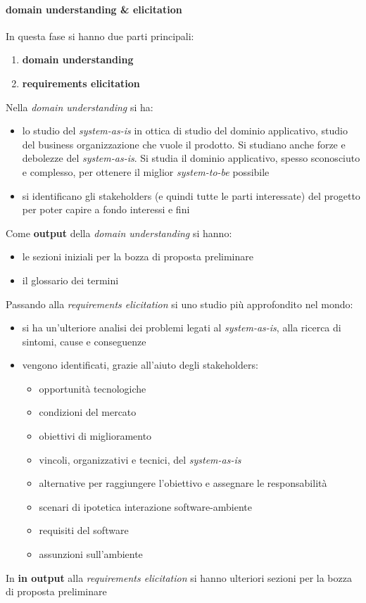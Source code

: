 \documentclass[a4paper,12pt, oneside]{book}
\begin{document}
\paragraph{domain understanding \& elicitation}
In questa fase si hanno due parti principali:
\begin{enumerate}
  \item \textbf{domain understanding}
  \item \textbf{requirements elicitation}
\end{enumerate}
\newpage
Nella \textit{domain understanding} si ha:
\begin{itemize}
  \item lo studio del \textit{system-as-is} in ottica di studio del dominio
  applicativo, studio del business organizzazione che vuole il prodotto. Si
  studiano anche forze e debolezze del \textit{system-as-is}. Si studia il
  dominio applicativo, spesso sconosciuto e complesso, per ottenere il miglior
  \textit{system-to-be} possibile
  \item si identificano gli stakeholders (e quindi tutte le parti interessate)
  del progetto per poter capire a fondo interessi e fini
\end{itemize}
Come \textbf{output} della \textit{domain understanding} si hanno:
\begin{itemize}
  \item le sezioni iniziali per la bozza di proposta preliminare
  \item il glossario dei termini
\end{itemize}
Passando alla \textit{requirements elicitation} si uno studio più approfondito
nel mondo:
\begin{itemize}
  \item si ha un'ulteriore analisi dei problemi legati al \textit{system-as-is},
  alla ricerca di sintomi, cause e conseguenze
  \item vengono identificati, grazie all'aiuto degli stakeholders:
  \begin{itemize}
    \item opportunità tecnologiche
    \item condizioni del mercato
    \item obiettivi di miglioramento
    \item vincoli, organizzativi e tecnici, del \textit{system-as-is}
    \item alternative per raggiungere l'obiettivo e assegnare le responsabilità
    \item scenari di ipotetica interazione software-ambiente
    \item requisiti del software
    \item assunzioni sull'ambiente
  \end{itemize}
\end{itemize}
In \textbf{in output} alla \textit{requirements elicitation} si hanno ulteriori
sezioni per la bozza di proposta preliminare
\end{document}
